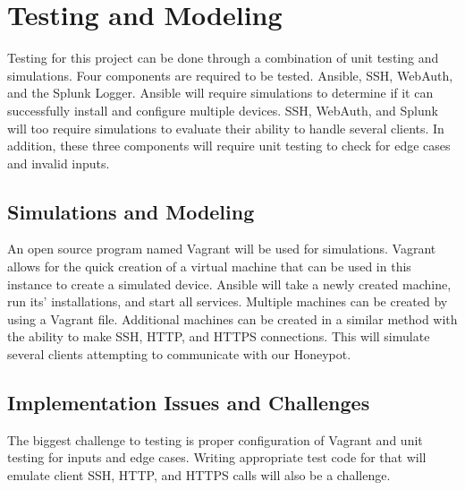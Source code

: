 \chapter{Testing and Modeling}
Testing for this project can be done through a combination of unit testing and simulations. Four components are required to be tested. Ansible, SSH, WebAuth, and the Splunk Logger. Ansible will require simulations to determine if it can successfully install and configure multiple devices. SSH, WebAuth, and Splunk will too require simulations to evaluate their ability to handle several clients. In addition, these three components will require unit testing to check for edge cases and invalid inputs.

\section{Simulations and Modeling}
An open source program named Vagrant will be used for simulations. Vagrant allows for the quick creation of a virtual machine that can be used in this instance to create a simulated device. Ansible will take a newly created machine, run its' installations, and start all services. Multiple machines can be created by using a Vagrant file. Additional machines can be created in a similar method with the ability to make SSH, HTTP, and HTTPS connections. This will simulate several clients attempting to communicate with our Honeypot.

\section{Implementation Issues and Challenges}
The biggest challenge to testing is proper configuration of Vagrant and unit testing for inputs and edge cases. Writing appropriate test code for that will emulate client SSH, HTTP, and HTTPS calls will also be a challenge.

